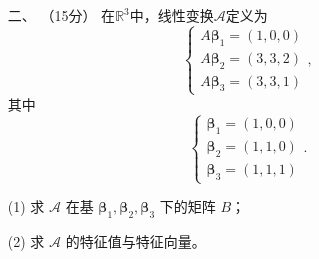 \begin{enumerate}[1~]
\item[二、]（15分）
在$\mathbb{R}^3$中，线性变换$\mathscr{A}$定义为
$$
\left\{ \begin{array} { l } { A \boldsymbol{\beta} _ { 1 } = ( 1,0,0 ) } \\ { A \boldsymbol{\beta} _ { 2 } = ( 3,3,2 ) } \\ { A \boldsymbol{\beta} _ { 3 } = ( 3,3,1 ) } \end{array} \right.,
$$
其中 
$$
\left\{ \begin{array} { l } { \boldsymbol{\beta} _ { 1 } = ( 1,0,0 ) } \\ { \boldsymbol{\beta} _ { 2 } = ( 1,1,0 ) } \\ { \boldsymbol{\beta} _ { 3 } = ( 1,1,1 ) } \end{array} \right..
$$

(1) 求 $\mathscr{A}$ 在基 $\boldsymbol{\beta} _ { 1 } ,  \boldsymbol{\beta} _ { 2 } ,  \boldsymbol{\beta} _ { 3 }$ 下的矩阵 $B$；

(2) 求 $\mathscr{A}$ 的特征值与特征向量。


\end{enumerate}
